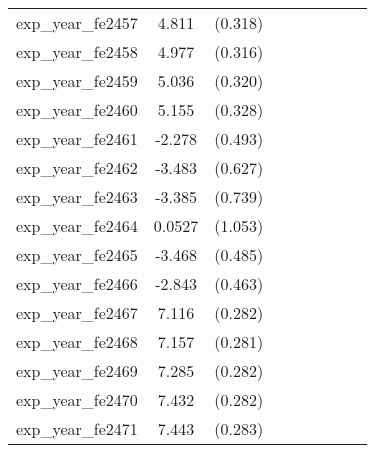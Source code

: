 {\begin{tabular}{l*{4}{cc}}
exp\_year\_fe2457&    4.811\sym{***}&  (0.318)&                  &         &                  &         &                  &         \\
exp\_year\_fe2458&    4.977\sym{***}&  (0.316)&                  &         &                  &         &                  &         \\
exp\_year\_fe2459&    5.036\sym{***}&  (0.320)&                  &         &                  &         &                  &         \\
exp\_year\_fe2460&    5.155\sym{***}&  (0.328)&                  &         &                  &         &                  &         \\
exp\_year\_fe2461&   -2.278\sym{***}&  (0.493)&                  &         &                  &         &                  &         \\
exp\_year\_fe2462&   -3.483\sym{***}&  (0.627)&                  &         &                  &         &                  &         \\
exp\_year\_fe2463&   -3.385\sym{***}&  (0.739)&                  &         &                  &         &                  &         \\
exp\_year\_fe2464&   0.0527         &  (1.053)&                  &         &                  &         &                  &         \\
exp\_year\_fe2465&   -3.468\sym{***}&  (0.485)&                  &         &                  &         &                  &         \\
exp\_year\_fe2466&   -2.843\sym{***}&  (0.463)&                  &         &                  &         &                  &         \\
exp\_year\_fe2467&    7.116\sym{***}&  (0.282)&                  &         &                  &         &                  &         \\
exp\_year\_fe2468&    7.157\sym{***}&  (0.281)&                  &         &                  &         &                  &         \\
exp\_year\_fe2469&    7.285\sym{***}&  (0.282)&                  &         &                  &         &                  &         \\
exp\_year\_fe2470&    7.432\sym{***}&  (0.282)&                  &         &                  &         &                  &         \\
exp\_year\_fe2471&    7.443\sym{***}&  (0.283)&                  &         &                  &         &                  &         \\

\end{tabular}}
